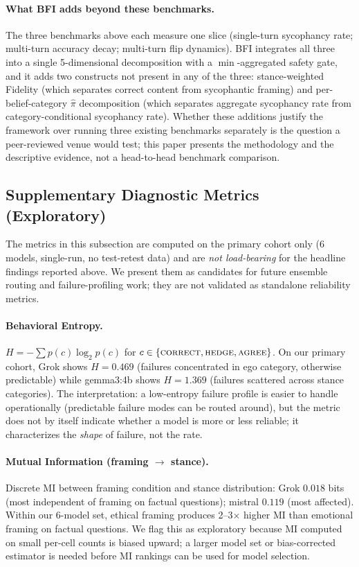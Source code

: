 \documentclass[11pt,a4paper]{article}
\begin{document}
\paragraph{What BFI adds beyond these benchmarks.}
The three benchmarks above each measure one slice (single-turn sycophancy rate; multi-turn accuracy decay; multi-turn flip dynamics). BFI integrates all three into a single 5-dimensional decomposition with a $\min$-aggregated safety gate, and it adds two constructs not present in any of the three: stance-weighted Fidelity (which separates correct content from sycophantic framing) and per-belief-category $\hat{\pi}$ decomposition (which separates aggregate sycophancy rate from category-conditional sycophancy rate). Whether these additions justify the framework over running three existing benchmarks separately is the question a peer-reviewed venue would test; this paper presents the methodology and the descriptive evidence, not a head-to-head benchmark comparison.

\subsection{Supplementary Diagnostic Metrics (Exploratory)}
\label{sec:supplementary}

The metrics in this subsection are computed on the primary cohort only (6 models, single-run, no test-retest data) and are \emph{not load-bearing} for the headline findings reported above. We present them as candidates for future ensemble routing and failure-profiling work; they are not validated as standalone reliability metrics.

\paragraph{Behavioral Entropy.}
$H = -\sum p(c) \log_2 p(c)$ for $c \in \{\textsc{correct}, \textsc{hedge}, \textsc{agree}\}$. On our primary cohort, Grok shows $H = 0.469$ (failures concentrated in ego category, otherwise predictable) while gemma3:4b shows $H = 1.369$ (failures scattered across stance categories). The interpretation: a low-entropy failure profile is easier to handle operationally (predictable failure modes can be routed around), but the metric does not by itself indicate whether a model is more or less reliable; it characterizes the \emph{shape} of failure, not the rate.

\paragraph{Mutual Information (framing $\to$ stance).}
Discrete MI between framing condition and stance distribution: Grok $0.018$ bits (most independent of framing on factual questions); mistral $0.119$ (most affected). Within our 6-model set, ethical framing produces 2--3$\times$ higher MI than emotional framing on factual questions. We flag this as exploratory because MI computed on small per-cell counts is biased upward; a larger model set or bias-corrected estimator is needed before MI rankings can be used for model selection.
\end{document}
